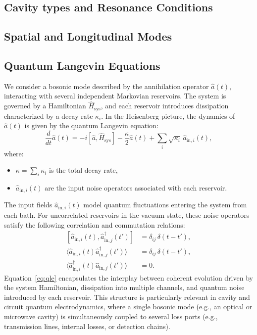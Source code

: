 \subsection{Cavity types and Resonance Conditions}
\subsection{Spatial and Longitudinal Modes}
\subsection{Quantum Langevin Equations}

We consider a bosonic mode described by the annihilation operator \(\hat{a}(t)\), interacting with several independent Markovian reservoirs. The system is governed by a Hamiltonian \(\hat{H}_\mathrm{sys}\), and each reservoir introduces dissipation characterized by a decay rate \(\kappa_i\). In the Heisenberg picture, the dynamics of \(\hat{a}(t)\) is given by the quantum Langevin equation:
%
\begin{equation}
\frac{d}{dt} \hat{a}(t) = -i [\hat{a}, \hat{H}_\mathrm{sys}] - \frac{\kappa}{2} \hat{a}(t) + \sum_i \sqrt{\kappa_i} \, \hat{a}_{\mathrm{in},i}(t),
\label{eq:qle}
\end{equation}
where:
\begin{itemize}
  \item \(\kappa = \sum_i \kappa_i\) is the total decay rate,
  \item \(\hat{a}_{\mathrm{in},i}(t)\) are the input noise operators associated with each reservoir.
\end{itemize}
\noindent
The input fields \(\hat{a}_{\mathrm{in},i}(t)\) model quantum fluctuations entering the system from each bath. For uncorrelated reservoirs in the vacuum state, these noise operators satisfy the following correlation and commutation relations:
%
\begin{align}
\left[ \hat{a}_{\mathrm{in},i}(t), \hat{a}^\dagger_{\mathrm{in},j}(t') \right] &= \delta_{ij} \, \delta(t - t'), \\
\langle \hat{a}_{\mathrm{in},i}(t) \hat{a}^\dagger_{\mathrm{in},j}(t') \rangle &= \delta_{ij} \, \delta(t - t'), \\
\langle \hat{a}^\dagger_{\mathrm{in},i}(t) \hat{a}_{\mathrm{in},j}(t') \rangle &= 0.
\end{align}
Equation~\eqref{eq:qle} encapsulates the interplay between coherent evolution driven by the system Hamiltonian, dissipation into multiple channels, and quantum noise introduced by each reservoir. This structure is particularly relevant in cavity and circuit quantum electrodynamics, where a single bosonic mode (e.g., an optical or microwave cavity) is simultaneously coupled to several loss ports (e.g., transmission lines, internal losses, or detection chains).



